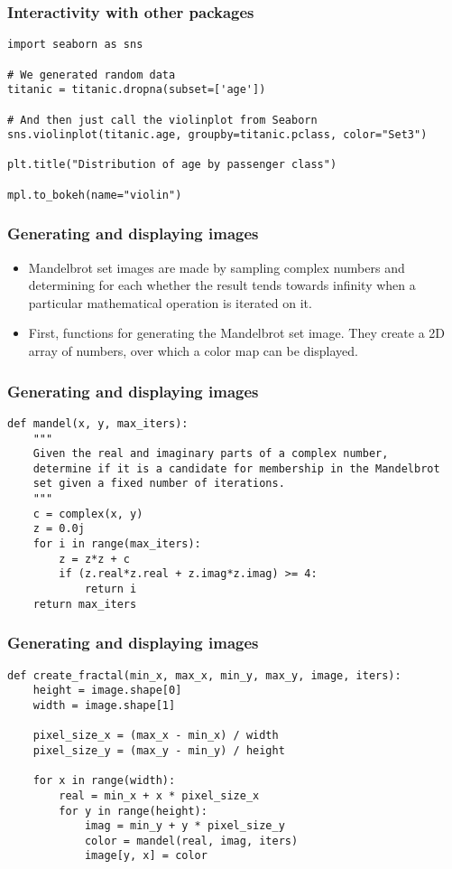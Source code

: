 \begin{frame}[fragile] \frametitle{Interactivity with other packages}
\begin{lstlisting}
import seaborn as sns

# We generated random data
titanic = titanic.dropna(subset=['age'])

# And then just call the violinplot from Seaborn
sns.violinplot(titanic.age, groupby=titanic.pclass, color="Set3")

plt.title("Distribution of age by passenger class")

mpl.to_bokeh(name="violin")
\end{lstlisting}
\end{frame}

\begin{frame}[fragile] \frametitle{Generating and displaying images}
\begin{itemize}
\item Mandelbrot set images are made by sampling complex numbers and determining for each whether the result tends towards infinity when a particular mathematical operation is iterated on it.
\item First, functions for generating the Mandelbrot set image. They create a 2D array of numbers, over which a color map can be displayed.
\end{itemize}
\end{frame}

\begin{frame}[fragile] \frametitle{Generating and displaying images}
\begin{lstlisting}
def mandel(x, y, max_iters):
    """
    Given the real and imaginary parts of a complex number,
    determine if it is a candidate for membership in the Mandelbrot
    set given a fixed number of iterations.
    """
    c = complex(x, y)
    z = 0.0j
    for i in range(max_iters):
        z = z*z + c
        if (z.real*z.real + z.imag*z.imag) >= 4:
            return i
    return max_iters
\end{lstlisting}
\end{frame}

\begin{frame}[fragile] \frametitle{Generating and displaying images}
\begin{lstlisting}
def create_fractal(min_x, max_x, min_y, max_y, image, iters):
    height = image.shape[0]
    width = image.shape[1]

    pixel_size_x = (max_x - min_x) / width
    pixel_size_y = (max_y - min_y) / height

    for x in range(width):
        real = min_x + x * pixel_size_x
        for y in range(height):
            imag = min_y + y * pixel_size_y
            color = mandel(real, imag, iters)
            image[y, x] = color
\end{lstlisting}
\end{frame}


